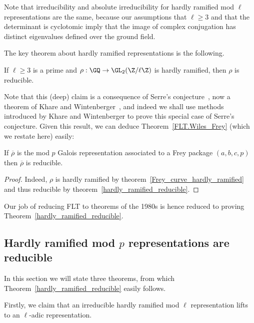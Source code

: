 Note that irreducibility and absolute irreducibility for hardly ramified mod $\ell$ representations
are the same, because our assumptions that $\ell\geq3$
and that the determinant is cyclotomic imply that the image of complex conjugation
has distinct eigenvalues defined over the ground field.

The key theorem about hardly ramified representations is the following.

\begin{theorem}
  \label{hardly_ramified_reducible}
  If $\ell\geq 3$ is a prime and $\rho:\GQ\to\GL_2(\Z/\ell\Z)$ is hardly ramified,
  then $\rho$ is reducible.
\end{theorem}

Note that this (deep) claim is a consequence of Serre's conjecture~\cite{serreconj},
now a theorem of Khare and Wintenberger~\cite{kwII}, and indeed we shall use
methods introduced by Khare and Wintenberger to prove this special case of
Serre's conjecture. Given this result, we can deduce Theorem~\ref{FLT.Wiles_Frey}
(which we restate here) easily:

\begin{theorem}
  \label{FLT.Wiles_Frey'}
  \leanok
  If $\overline{\rho}$ is the mod $p$ Galois representation associated to a Frey package $(a,b,c,p)$ then
  $\overline{\rho}$ is reducible.
\end{theorem}
\begin{proof}
  Indeed, $\rho$ is hardly ramified by theorem~\ref{Frey_curve_hardly_ramified}
  and thus reducible by theorem~\ref{hardly_ramified_reducible}.
\end{proof}

Our job of reducing FLT to theorems of the 1980s is hence reduced to proving
Theorem~\ref{hardly_ramified_reducible}.

\subsection{Hardly ramified mod $p$ representations are reducible}

In this section we will state three theorems, from which Theorem~\ref{hardly_ramified_reducible}
easily follows.

Firstly, we claim that
an irreducible hardly ramified mod $\ell$ representation lifts to an $\ell$-adic representation.

